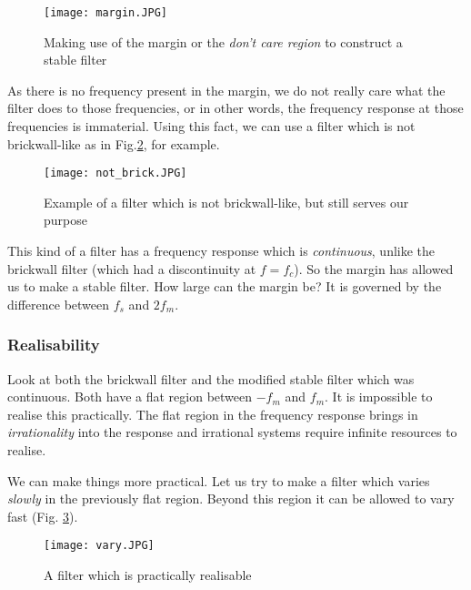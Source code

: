 \begin{figure}[h] 
        \centering
        \texttt{[image: margin.JPG]}
        \caption{Making use of the margin or the \textit{don't care region} to construct a stable filter}
        \label{margin}
\end{figure}
As there is no frequency present in the margin, we do not really care what the filter does to those frequencies, or in other words, the frequency response at those frequencies is immaterial. Using this fact, we can use a filter which is not brickwall-like as in Fig.\ref{not_brick}, for example. 
\begin{figure}[h]
        \centering
                \texttt{[image: not\_brick.JPG]}
                \caption{Example of a filter which is not brickwall-like, but still serves our purpose}
                \label{not_brick}
\end{figure}
This kind of a filter has a frequency response which is \textit{continuous}, unlike the brickwall filter (which had a discontinuity at $f = f_{c}$). So the margin has allowed us to make a stable filter. How large can the margin be? It is governed by the difference between $f_{s}$ and $2f_{m}$. 
\newpage
\subsubsection{Realisability}
Look at both the brickwall filter and the modified stable filter which was continuous. Both have a flat region between $-f_{m}$ and $f_{m}$. It is impossible to realise this practically. The flat region in the frequency response brings in \textit{irrationality} into the response and irrational systems require infinite resources to realise. 

We can make things more practical. Let us try to make a filter which varies \textit{slowly} in the previously flat region. Beyond this region it can be allowed to vary fast (Fig. \ref{vary}).
\begin{figure}[h] 
        \centering
        
                \texttt{[image: vary.JPG]}
                \caption{A filter which is practically realisable}
                \label{vary}
        
\end{figure}

